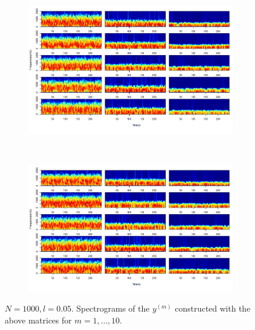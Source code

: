 \documentclass[11pt, a4paper]{article} %
\begin{document}

\begin{figure}[H]
\begin{subfigure}{1.1\textwidth}
  \centering
  \includegraphics[width=\linewidth]{spectro_N1000_l005_ym_1_5.png}
  \label{fig:sfig1}
\end{subfigure}\\
\begin{subfigure}{1.1\textwidth}
  \centering
  \includegraphics[width=\linewidth]{spectro_N1000_l005_ym_6_10.png}
  \label{fig:sfig2}
\end{subfigure}
\caption{$N = 1000, l = 0.05$. Spectrograms of the $ y^{(m)}$ constructed with the above matrices for $m = 1, \dots, 10$.  }
\label{fig:fig}
\end{figure}

\restoregeometry



\end{document}

